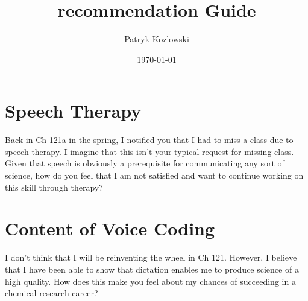 \documentclass[12pt]{article}
\title{recommendation Guide}
\author{Patryk Kozlowski}
\date{\today}
\begin{document}
\maketitle
\section{Speech Therapy}
Back in Ch 121a in the spring, I notified you that I had to miss a class due to speech therapy. I imagine that this isn't your typical request for missing class. Given that speech is obviously a prerequisite for communicating any sort of science, how do you feel that I am not satisfied and want to continue working on this skill through therapy?
\section{Content of Voice Coding}
I don't think that I will be reinventing the wheel in Ch 121. However, I believe that I have been able to show that dictation enables me to produce science of a high quality. How does this make you feel about my chances of succeeding in a chemical research career?
\end{document}

